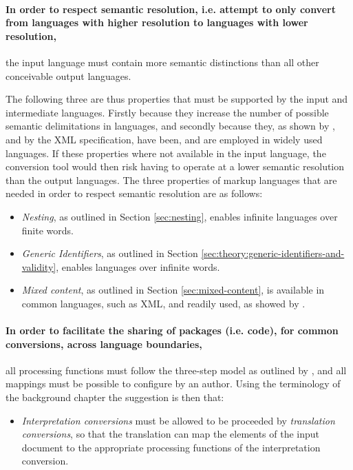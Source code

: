 \documentclass{scrreprt}
\begin{document}
\paragraph{In order to respect semantic resolution, i.e. attempt to only convert from languages with higher resolution to languages with lower resolution,} the input language must contain more semantic distinctions than all other conceivable output languages.

The following three are thus properties that must be supported by the input and intermediate languages. Firstly because they increase the number of possible semantic delimitations in languages, and secondly because they, as shown by \citet{coombs}, and by the XML specification\citep{xmlFirstWorkingDraft}, have been, and are employed in widely used languages. If these properties where not available in the input language, the conversion tool would then risk having to operate at a lower semantic resolution than the output languages. The three properties of markup languages that are needed in order to respect semantic resolution are as follows:

\begin{itemize}
\item \emph{Nesting}, as outlined in Section \ref{sec:nesting}, enables infinite languages over finite words.
\item \emph{Generic Identifiers}, as outlined in Section \ref{sec:theory:generic-identifiers-and-validity}, enables languages over infinite words.
\item \emph{Mixed content}, as outlined in Section \ref{sec:mixed-content}, is available in common languages, such as XML\citep{xmlFirstRecommendation}, and readily used, as showed by \citet{mignet}.
\end{itemize}



\paragraph{In order to facilitate the sharing of packages (i.e. code), for common conversions, across language boundaries, } all processing functions must follow the three-step model as outlined by \citet{goldfarb}, and all mappings must be possible to configure by an author. Using the terminology of the background chapter the suggestion is then that:

\begin{itemize}
\item \emph{Interpretation conversions} must be allowed to be proceeded by \emph{translation conversions}, so that the translation can map the elements of the input document to the appropriate processing functions of the interpretation conversion.
\end{itemize}
\end{document}
